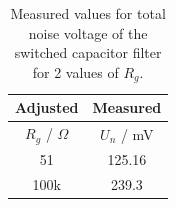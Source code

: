 
\begin{table}[ht!]
\centering
\begin{tabular}{|c||c|}
    \hline
    \textbf{Adjusted} &
    \textbf{Measured} \\
    \hline
    $R_g$ / $\Omega$ & $U_n$ / mV \\
    \hline\hline
    51 & 125.16 \\
    100k & 239.3 \\
    \hline
    \end{tabular}
    \caption{\centering Measured values for total noise voltage of the switched capacitor filter for 2 values of $R_g$.}
    \label{tab:mes}
\end{table}
